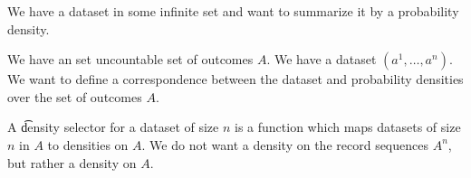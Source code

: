 

We have a dataset in some infinite set and want to summarize it by a probability density.


We have an set uncountable set of outcomes $A$.
We have a dataset $(a^1, \dots, a^n)$.  We want to define a correspondence between the dataset and probability densities over the set of outcomes $A$.

A \t{density selector} for a dataset of size $n$ is a function which maps datasets of size $n$ in $A$ to densities on $A$.
We do not want a density on the record sequences $A^n$, but rather a density on $A$.
